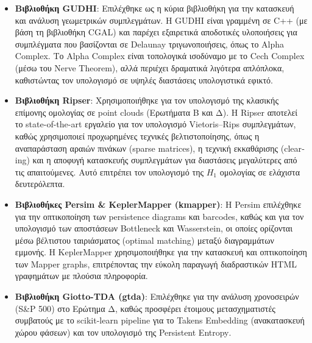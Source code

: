 \documentclass[12pt]{article}
\newcommand{\en}[1]{\foreignlanguage{english}{#1}}
\begin{document}
\begin{itemize}
    \item \textbf{Βιβλιοθήκη \en{GUDHI}}: Επιλέχθηκε ως η κύρια βιβλιοθήκη για την κατασκευή και ανάλυση γεωμετρικών συμπλεγμάτων. Η \en{GUDHI} είναι γραμμένη σε \en{C++} (με βάση τη βιβλιοθήκη \en{CGAL}) και παρέχει εξαιρετικά αποδοτικές υλοποιήσεις για συμπλέγματα που βασίζονται σε \en{Delaunay} τριγωνοποιήσεις, όπως το \en{Alpha Complex}. Το \en{Alpha Complex} είναι τοπολογικά ισοδύναμο με το \en{Cech Complex} (μέσω του \en{Nerve Theorem}), αλλά περιέχει δραματικά λιγότερα απλόπλοκα, καθιστώντας τον υπολογισμό σε υψηλές διαστάσεις υπολογιστικά εφικτό.
    
    \item \textbf{Βιβλιοθήκη \en{Ripser}}: Χρησιμοποιήθηκε για τον υπολογισμό της κλασικής επίμονης ομολογίας σε \en{point clouds} (Ερωτήματα Β και Δ). Η \en{Ripser} αποτελεί το \en{state-of-the-art} εργαλείο για τον υπολογισμό \en{Vietoris--Rips} συμπλεγμάτων, καθώς χρησιμοποιεί προχωρημένες τεχνικές βελτιστοποίησης, όπως η αναπαράσταση αραιών πινάκων (\en{sparse matrices}), η τεχνική εκκαθάρισης (\en{clearing}) και η αποφυγή κατασκευής συμπλεγμάτων για διαστάσεις μεγαλύτερες από τις απαιτούμενες. Αυτό επιτρέπει τον υπολογισμό της $H_1$ ομολογίας σε ελάχιστα δευτερόλεπτα.
    
    \item \textbf{Βιβλιοθήκες \en{Persim} \& \en{KeplerMapper} (\en{kmapper})}: Η \en{Persim} επιλέχθηκε για την οπτικοποίηση των \en{persistence diagrams} και \en{barcodes}, καθώς και για τον υπολογισμό των αποστάσεων \en{Bottleneck} και \en{Wasserstein}, οι οποίες ορίζονται μέσω βέλτιστου ταιριάσματος (\en{optimal matching}) μεταξύ διαγραμμάτων εμμονής. Η \en{KeplerMapper} χρησιμοποιήθηκε για την κατασκευή και οπτικοποίηση των \en{Mapper graphs}, επιτρέποντας την εύκολη παραγωγή διαδραστικών \en{HTML} γραφημάτων με πλούσια πληροφορία.
    
    \item \textbf{Βιβλιοθήκη \en{Giotto-TDA} (\en{gtda})}: Επιλέχθηκε για την ανάλυση χρονοσειρών (\en{S\&P 500}) στο Ερώτημα Δ, καθώς προσφέρει έτοιμους μετασχηματιστές συμβατούς με το \en{scikit-learn pipeline} για το \en{Takens Embedding} (ανακατασκευή χώρου φάσεων) και τον υπολογισμό της \en{Persistent Entropy}.
    

\end{itemize}
\end{document}
